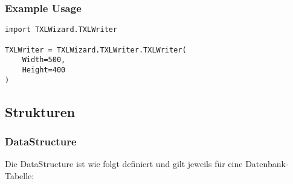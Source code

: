         \subsubsection{Example Usage}
            \begin{lstlisting}
import TXLWizard.TXLWriter

TXLWriter = TXLWizard.TXLWriter.TXLWriter(
    Width=500,
    Height=400
)
            \end{lstlisting}

    \subsection{Strukturen}
        \subsubsection{DataStructure}
            Die DataStructure ist wie folgt definiert und gilt jeweils für eine Datenbank-Tabelle:
